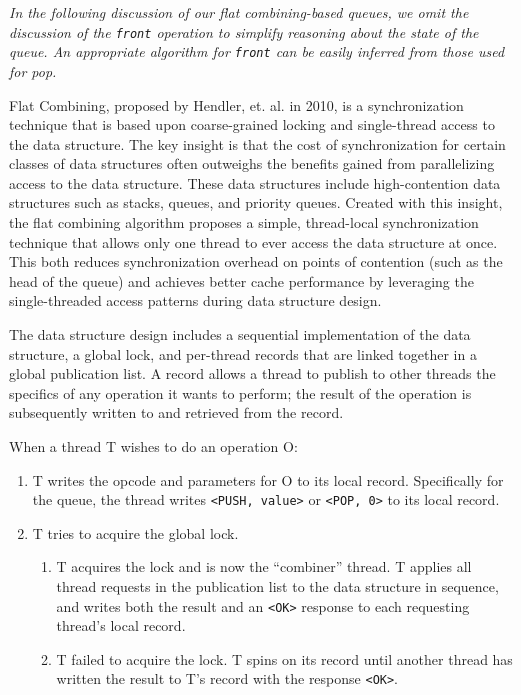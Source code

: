 \emph{In the following discussion of our flat combining-based queues, we omit the discussion of the \texttt{front} operation to simplify reasoning about the state of the queue. An appropriate algorithm for \texttt{front} can be easily inferred from those used for pop.}

Flat Combining, proposed by Hendler, et. al. in 2010\cite{flatcombining}, is a synchronization technique that is based upon coarse-grained locking and single-thread access to the data structure. The key insight is that the cost of synchronization for certain classes of data structures often outweighs the benefits gained from parallelizing access to the data structure. These data structures include high-contention data structures such as stacks, queues, and priority queues. Created with this insight, the flat combining algorithm proposes a simple, thread-local synchronization technique that allows only one thread to ever access the data structure at once. This both reduces synchronization overhead on points of contention (such as the head of the queue) and achieves better cache performance by leveraging the single-threaded access patterns during data structure design.

The data structure design includes a sequential implementation of the data structure, a global lock, and per-thread records that are linked together in a global publication list. A record allows a thread to publish to other threads the specifics of any operation it wants to perform; the result of the operation is subsequently written to and retrieved from the record.

When a thread T wishes to do an operation O:
\begin{enumerate}
    \item T writes the opcode and parameters for O to its local record. Specifically for the queue, the thread writes \texttt{<PUSH, value>} or \texttt{<POP, 0>} to its local record.
   \item T tries to acquire the global lock.
   \begin{enumerate}
        \item T acquires the lock and is now the “combiner” thread. T applies all thread requests in the publication list to the data structure in sequence, and writes both the result and an \texttt{<OK>} response to each requesting thread's local record.
        \item T failed to acquire the lock. T spins on its record until another thread has written the result to T's record with the response \texttt{<OK>}.
    \end{enumerate}
\end{enumerate}

